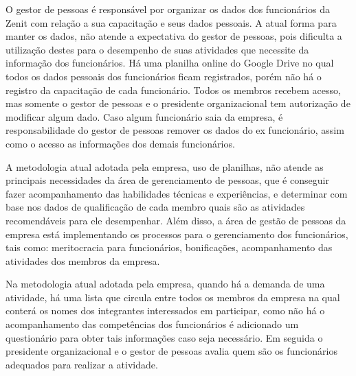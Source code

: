 O gestor de pessoas é responsável por organizar os dados dos funcionários da Zenit com relação a sua capacitação e seus dados pessoais. A atual forma para manter os dados, não atende a expectativa do gestor de pessoas, pois dificulta a utilização destes para o desempenho de suas atividades que necessite da informação dos funcionários. Há uma planilha online do Google Drive no qual todos os dados pessoais dos funcionários ficam registrados, porém não há o registro da capacitação de cada funcionário. Todos os membros recebem acesso, mas somente  o gestor de pessoas e o presidente organizacional tem autorização de modificar algum dado. Caso algum funcionário saia da empresa, é responsabilidade do gestor de pessoas remover os dados do ex funcionário, assim como o acesso as informações dos demais funcionários.

A metodologia atual adotada pela empresa, uso de planilhas,  não atende as principais necessidades  da área de gerenciamento de pessoas, que é conseguir fazer acompanhamento das habilidades técnicas e experiências, e determinar com base nos dados de qualificação de cada membro quais são as atividades recomendáveis para ele desempenhar. Além disso, a área de gestão de pessoas da empresa está implementando os processos para o gerenciamento dos funcionários, tais como: meritocracia para funcionários, bonificações, acompanhamento das atividades dos membros da empresa.

Na metodologia atual adotada pela empresa, quando há a demanda de uma atividade, há uma lista que circula entre todos os membros da empresa na qual conterá os nomes dos integrantes interessados em participar, como não há o acompanhamento das competências dos funcionários é adicionado um questionário para obter tais informações caso seja necessário. Em seguida o presidente organizacional e o gestor de pessoas avalia quem são os funcionários adequados para realizar a atividade.


